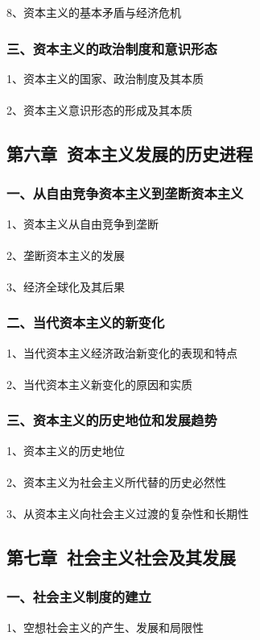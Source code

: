 \documentclass{ctexart}
\begin{document}
8、资本主义的基本矛盾与经济危机

\subsubsection{三、资本主义的政治制度和意识形态}
1、资本主义的国家、政治制度及其本质
\\\\

2、资本主义意识形态的形成及其本质

\subsection{第六章\ 资本主义发展的历史进程}
\subsubsection{一、从自由竞争资本主义到垄断资本主义}
1、资本主义从自由竞争到垄断
\\\\

2、垄断资本主义的发展
\\\\

3、经济全球化及其后果

\subsubsection{二、当代资本主义的新变化}
1、当代资本主义经济政治新变化的表现和特点
\\\\

2、当代资本主义新变化的原因和实质

\subsubsection{三、资本主义的历史地位和发展趋势}
1、资本主义的历史地位
\\\\

2、资本主义为社会主义所代替的历史必然性
\\\\

3、从资本主义向社会主义过渡的复杂性和长期性

\subsection{第七章\ 社会主义社会及其发展}
\subsubsection{一、社会主义制度的建立}
1、空想社会主义的产生、发展和局限性
\\\\
\end{document}
